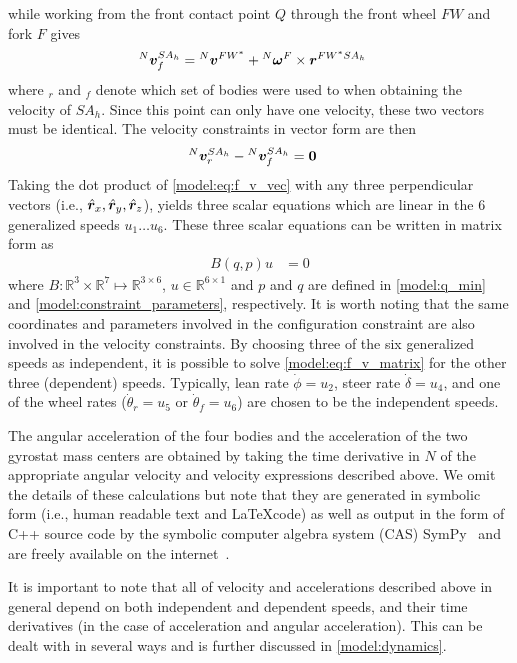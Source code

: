 while working from the front contact point $Q$ through the front wheel $FW$ and
fork $F$ gives
\begin{align}
  {}^{N}\boldsymbol{v}^{SA_h}_f &= {}^{N}\boldsymbol{v}^{FW^*} + {}^{N}\boldsymbol{\omega}^{F} \times \boldsymbol{r}^{FW^*SA_h}
\end{align}
where $_r$ and $_f$ denote which set of bodies were used to when obtaining the
velocity of $SA_h$. Since this point can only have one velocity, these two
vectors must be identical. The velocity constraints in vector form are then
\begin{align}
  {}^{N}\boldsymbol{v}^{SA_h}_r - {}^{N}\boldsymbol{v}^{SA_h}_f &= \boldsymbol{0}
  \label{model:eq:f_v_vec}
\end{align}
Taking the dot product of \autoref{model:eq:f_v_vec} with any three
perpendicular vectors (i.e., $\hat{\boldsymbol{r}}_{x}, \hat{\boldsymbol{r}}_{y}, \hat{\boldsymbol{r}}_{z}$), yields three
scalar equations which are linear in the 6 generalized speeds $u_1 \dots u_6$.
These three scalar equations can be written in matrix form as
\begin{align}
  B(q, p) u &= 0
  \label{model:eq:f_v_matrix}
\end{align}
where $B:\mathbb{R}^3 \times \mathbb{R}^7 \mapsto \mathbb{R}^{3 \times 6}$,
$u\in\mathbb{R}^{6 \times 1}$ and $p$ and $q$ are defined in
\autoref{model:q_min} and \autoref{model:constraint_parameters}, respectively.
It is worth noting that the same coordinates and parameters involved in the
configuration constraint are also involved in the velocity constraints. By
choosing three of the six generalized speeds as independent, it is possible to
solve \autoref{model:eq:f_v_matrix} for the other three (dependent) speeds.
Typically, lean rate $\dot{\phi} = u_2$, steer rate $\dot{\delta} = u_4$, and
one of the wheel rates ($\dot{\theta}_r = u_5$ or $\dot{\theta}_f = u_6$) are
chosen to be the independent speeds.

The angular acceleration of the four bodies and the acceleration of the two
gyrostat mass centers are obtained by taking the time derivative in $N$ of the
appropriate angular velocity and velocity expressions described above. We omit
the details of these calculations but note that they are generated in symbolic
form (i.e., human readable text and \LaTeX code) as well as output in the form
of C++ source code by the symbolic computer algebra system (CAS) SymPy~\cite{SymPy}
and are freely available on the internet~\cite{libbicycle}.

It is important to note that all of velocity and accelerations described above
in general depend on both independent and dependent speeds, and their time
derivatives (in the case of acceleration and angular acceleration). This can be
dealt with in several ways and is further discussed in \autoref{model:dynamics}.


